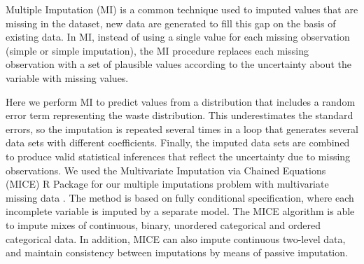 \documentclass[11pt]{article}
\theoremstyle{definition}
\theoremstyle{remark}
\begin{document}
Multiple Imputation (MI) is a common technique used to imputed values that are missing in the dataset, new data are generated to fill this gap on the basis of existing data. In MI, instead of using a single value for each missing observation (simple or simple imputation), the MI procedure replaces each missing observation with a set of plausible values according to the uncertainty about the variable with missing values. 

Here we perform MI to predict values from a distribution that includes a random error term representing the waste distribution. This underestimates the standard errors, so the imputation is repeated several times in a loop that generates several data sets with different coefficients. Finally, the imputed data sets are combined to produce valid statistical inferences that reflect the uncertainty due to missing observations.
We used the Multivariate Imputation via Chained Equations (MICE) R Package for our multiple imputations problem with multivariate missing data \cite{buuren2010mice}. The method is based on fully conditional specification, where each incomplete variable is imputed by a separate model. The MICE algorithm is able to impute mixes of continuous, binary, unordered categorical and ordered categorical data. In addition, MICE can also impute continuous two-level data, and maintain consistency between imputations by means of passive imputation. 
\end{document}
